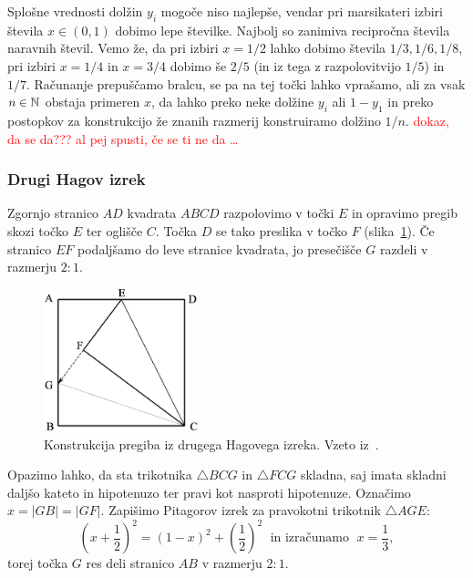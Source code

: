 Splošne vrednosti dolžin $y_i$ mogoče niso najlepše, vendar pri marsikateri izbiri števila $x \in (0,1)$ dobimo lepe številke. Najbolj so zanimiva recipročna števila naravnih števil. Vemo že, da pri izbiri $x = 1/2$ lahko dobimo števila $1/3, 1/6, 1/8$, pri izbiri $x = 1/4$ in $x = 3/4$ dobimo še $2/5$ (in iz tega z razpolovitvijo $1/5$) in $1/7$. Računanje prepuščamo bralcu, se pa na tej točki lahko vprašamo, ali za vsak $n \in \mathbb N$ obstaja primeren $x$, da lahko preko neke dolžine $y_i$ ali $1-y_1$ in preko postopkov za konstrukcijo že znanih razmerij konstruiramo dolžino $1/n$. \textcolor{red}{dokaz, da se da??? al pej spusti, če se ti ne da \ldots}

\subsubsection{Drugi Hagov izrek}

\begin{izrek}
    Zgornjo stranico $AD$ kvadrata $ABCD$ razpolovimo v točki $E$ in opravimo pregib skozi točko $E$ ter oglišče $C$. Točka $D$ se tako preslika v točko $F$ (slika~\ref{fig:hagov_izrek2}). Če stranico $EF$ podaljšamo do leve stranice kvadrata, jo presečišče $G$ razdeli v razmerju $2:1$.
\end{izrek}

\begin{figure}[h]
    \centering
    \includegraphics[width=0.4\textwidth]{images/hagovi_izreki/hagov_izrek2.png}
    \caption[Pregib iz drugega Hagovega izreka]{Konstrukcija pregiba iz drugega Hagovega izreka. Vzeto iz~\cite[str. 12]{haga2008}.}
    \label{fig:hagov_izrek2}
\end{figure}

\begin{dokaz}
    Opazimo lahko, da sta trikotnika $\triangle BCG$ in $\triangle FCG$ skladna, saj imata skladni daljšo kateto in hipotenuzo ter pravi kot nasproti hipotenuze. Označimo $x = |GB| = |GF|$. Zapišimo Pitagorov izrek za pravokotni trikotnik $\triangle AGE$:
    $$ \left(x + \frac{1}{2}\right)^2 = (1-x)^2 + \left(\frac{1}{2}\right)^2 \; \text{ in izračunamo } \; x = \frac{1}{3},$$
    torej točka $G$ res deli stranico $AB$ v razmerju $2:1$.
\end{dokaz}

